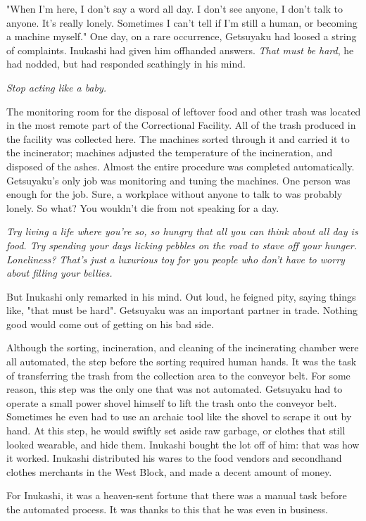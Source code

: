 "When I'm here, I don't say a word all day. I don't see anyone, I don't
talk to anyone. It's really lonely. Sometimes I can't tell if I'm still
a human, or becoming a machine myself." One day, on a rare occurrence,
Getsuyaku had loosed a string of complaints. Inukashi had given him
offhanded answers. \emph{That must be hard}, he had nodded, but had responded
scathingly in his mind.

\emph{Stop acting like a baby.}

The monitoring room for the disposal of leftover food and other trash
was located in the most remote part of the Correctional Facility. All of
the trash produced in the facility was collected here. The machines
sorted through it and carried it to the incinerator; machines adjusted
the temperature of the incineration, and disposed of the ashes. Almost
the entire procedure was completed automatically. Getsuyaku's only job
was monitoring and tuning the machines. One person was enough for the
job. Sure, a workplace without anyone to talk to was probably lonely. So
what? You wouldn't die from not speaking for a day.

\emph{Try living a life where you're so, so hungry that all you can think
about all day is food. Try spending your days licking pebbles on the
road to stave off your hunger. Loneliness? That's just a luxurious toy
for you people who don't have to worry about filling your bellies.}

But Inukashi only remarked in his mind. Out loud, he feigned pity,
saying things like, "that must be hard". Getsuyaku was an important
partner in trade. Nothing good would come out of getting on his bad
side.

Although the sorting, incineration, and cleaning of the incinerating
chamber were all automated, the step before the sorting required human
hands. It was the task of transferring the trash from the collection
area to the conveyor belt. For some reason, this step was the only one
that was not automated. Getsuyaku had to operate a small power shovel
himself to lift the trash onto the conveyor belt. Sometimes he even had
to use an archaic tool like the shovel to scrape it out by hand. At this
step, he would swiftly set aside raw garbage, or clothes that still
looked wearable, and hide them. Inukashi bought the lot off of him: that
was how it worked. Inukashi distributed his wares to the food vendors
and secondhand clothes merchants in the West Block, and made a decent
amount of money.

For Inukashi, it was a heaven-sent fortune that there was a manual task
before the automated process. It was thanks to this that he was even in
business.

